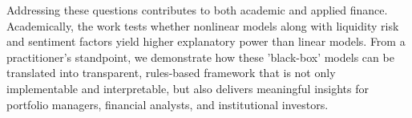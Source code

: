 Addressing these questions contributes to both academic and applied finance. Academically, the work tests whether nonlinear models along with liquidity risk and sentiment factors yield higher explanatory power than linear models. From a practitioner's standpoint, we demonstrate how these 'black-box' models can be translated into transparent, rules-based framework that is not only implementable and interpretable, but also delivers meaningful insights for portfolio managers, financial analysts, and institutional investors. 

